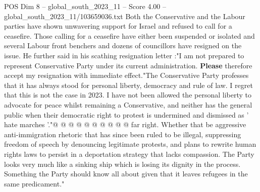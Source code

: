 \begin{textsample}{POS Dim 8 – global\_south\_2023\_11 – Score 4.00 – global\_south\_2023\_11/103659036.txt}
Both the Conservative and the Labour parties have shown unwavering support for Israel and refused to call for a ceasefire.
Those calling for a ceasefire have either been suspended or isolated and several Labour front benchers and dozens of councillors have resigned on the issue.
He further said in his scathing resignation letter :"I am not prepared to represent Conservative Party under its current administration. \textbf{Please} therefore accept my resignation with immediate effect."The Conservative Party professes that it has always stood for personal liberty, democracy and rule of law.
I regret that this is not the case in 2023.
I have not been allowed the personal liberty to advocate for peace whilst remaining a Conservative, and neither has the general public when their democratic right to protest is undermined and dismissed as ' hate marches '."@ @ @ @ @ @ @ @ @ @ far right.
Whether that be aggressive anti-immigration rhetoric that has since been ruled to be illegal, suppressing freedom of speech by denouncing legitimate protests, and plans to rewrite human rights laws to persist in a deportation strategy that lacks compassion.
The Party looks very much like a sinking ship which is losing its dignity in the process.
Something the Party should know all about given that it leaves refugees in the same predicament."

\end{textsample}
